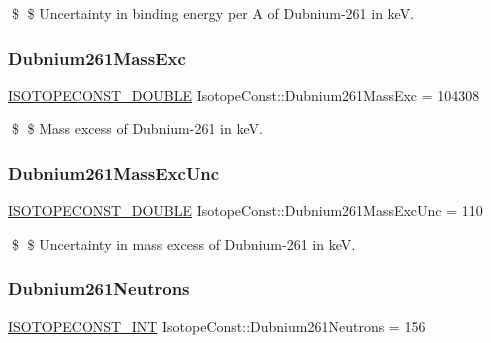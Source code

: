 \$ \$ Uncertainty in binding energy per A of Dubnium-\/261 in keV. \mbox{\label{group___isotope_const-_dubnium-_db261_gaa579d0e4620850385e5494296b2f4133}} 
\subsubsection{\texorpdfstring{Dubnium261\+Mass\+Exc}{Dubnium261MassExc}}
{\footnotesize\ttfamily \mbox{\hyperlink{group___isotope_const-_macros_ga8f45a7272ce02c0b4c65c44636ed719a}{I\+S\+O\+T\+O\+P\+E\+C\+O\+N\+S\+T\+\_\+\+D\+O\+U\+B\+LE}} Isotope\+Const\+::\+Dubnium261\+Mass\+Exc = 104308}

\$ \$ Mass excess of Dubnium-\/261 in keV. \mbox{\label{group___isotope_const-_dubnium-_db261_ga8859dd76d47c57b137c469916314fa78}} 
\subsubsection{\texorpdfstring{Dubnium261\+Mass\+Exc\+Unc}{Dubnium261MassExcUnc}}
{\footnotesize\ttfamily \mbox{\hyperlink{group___isotope_const-_macros_ga8f45a7272ce02c0b4c65c44636ed719a}{I\+S\+O\+T\+O\+P\+E\+C\+O\+N\+S\+T\+\_\+\+D\+O\+U\+B\+LE}} Isotope\+Const\+::\+Dubnium261\+Mass\+Exc\+Unc = 110}

\$ \$ Uncertainty in mass excess of Dubnium-\/261 in keV. \mbox{\label{group___isotope_const-_dubnium-_db261_gafbba469057a4b34c00d0b20e4201fa21}} 
\subsubsection{\texorpdfstring{Dubnium261\+Neutrons}{Dubnium261Neutrons}}
{\footnotesize\ttfamily \mbox{\hyperlink{group___isotope_const-_macros_ga5f18360b3e99483a35c32d789e62621c}{I\+S\+O\+T\+O\+P\+E\+C\+O\+N\+S\+T\+\_\+\+I\+NT}} Isotope\+Const\+::\+Dubnium261\+Neutrons = 156}

